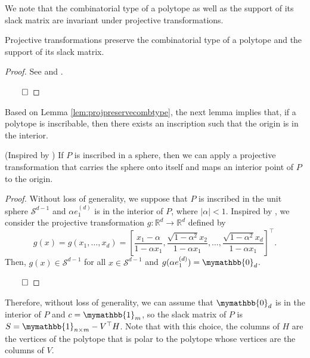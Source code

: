 \documentclass[smallextended, envcountsame]{svjour3}
\begin{document}
    We note that the combinatorial type of a polytope as well as the support of its slack matrix are invariant under projective transformations.
    \begin{lemma}\label{lem:projpreservecombtype}
        Projective transformations preserve the combinatorial type of a polytope and the support of its slack matrix.
    \end{lemma}
    \begin{proof}
        See \cite{gouveia2019slack} and \cite[Corollary 1.5]{gouveia2017four}.
        
    $\hfill\qed$
    \end{proof}
    Based on Lemma \ref{lem:projpreservecombtype}, the next lemma implies that, if a polytope is inscribable, then there exists an inscription such that the origin is in the interior.
    \begin{lemma}(Inspired by \cite[p. 285]{grunbaum2003convex})\label{lem:0ininterior}
        If $P$ is inscribed in a sphere, then we can apply a projective transformation that carries the sphere onto itself and maps an interior point of $P$ to the origin.  
    \end{lemma}
    \begin{proof}
        Without loss of generality, we suppose that $P$ is inscribed in the unit sphere $\mathcal{S}^{d-1}$ and $\alpha e_1^{(d)}$ is in the interior of $P$, where $|\alpha|<1$.  Inspired by \cite[p. 285]{grunbaum2003convex}, we consider the projective transformation $g:\mathbb{R}^d\to\mathbb{R}^d$ defined by
        \begin{equation*}
            g(x) = g(x_1,\ldots,x_d) = \left[\frac{x_1-\alpha}{1-\alpha x_1},\frac{\sqrt{1-\alpha^2}x_2}{1-\alpha x_1},\ldots,\frac{\sqrt{1-\alpha^2}x_d}{1-\alpha x_1}\right]^\top.
        \end{equation*}
        Then, $g(x)\in\mathcal{S}^{d-1}$ for all $x\in\mathcal{S}^{d-1}$ and $g(\alpha e_1^{(d)})=\mymathbb{0}_d$.

    $\hfill\qed$
    \end{proof}
    Therefore, without loss of generality, we can assume that $\mymathbb{0}_d$ is in the interior of $P$ and $c=\mymathbb{1}_m$, so the slack matrix of $P$ is $S=\mymathbb{1}_{n\times m}-V^\top H$.  Note that with this choice, the columns of $H$ are the vertices of the polytope that is polar to the polytope whose vertices are the columns of $V$.
\end{document}
